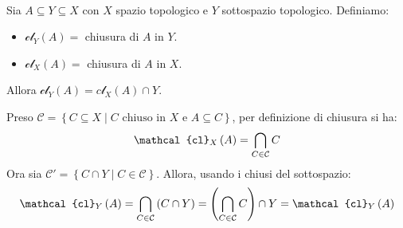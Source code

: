 \begin{lemming}~{}\\
Sia $A\subseteq Y\subseteq X$ con $X$ spazio topologico e $Y$ sottospazio topologico. Definiamo:
\begin{itemize}
\item $\mathcal{cl}_Y\left(A\right)=$ chiusura di $A$ in $Y$.
\item $\mathcal{cl}_X\left(A\right)=$ chiusura di $A$ in $X$.
\end{itemize}
Allora $\mathcal{cl}_Y\left(A\right)=c\mathcal{l}_X\left(A\right)\cap Y$.
\end{lemming}
\begin{demonstration}
Preso $\mathcal{C}=\left\{C\subseteq X\mid C\text{ chiuso in }X\text{ e } A\subseteq C\right\}$, per definizione di chiusura si ha:
\begin{equation*}
\mathcal{cl}_X\left(A\right)=\inter_{C\in\mathcal{C}}C
\end{equation*}
Ora sia $\mathcal{C}'=\left\{C\cap Y\mid C\in\mathcal{C}\right\}$. Allora, usando i chiusi del sottospazio:
\begin{equation*}
\mathcal{cl}_Y\left(A\right)=\inter_{C\in\mathcal{C}}\left(C\cap Y\right)=\left(\inter_{C\in\mathcal{C}}C\right)\cap Y=\mathcal{cl}_Y\left(A\right)
\end{equation*}
\end{demonstration}

